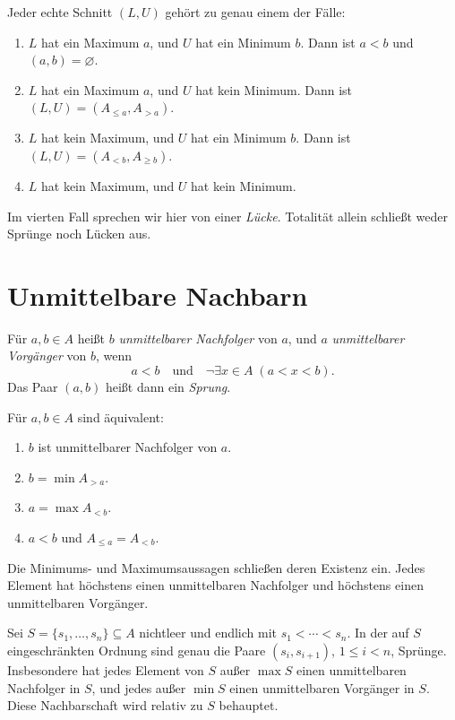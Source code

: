 \begin{theorem}
\label{b15guide:thm:cut-types}
Jeder echte Schnitt $(L,U)$ gehört zu genau einem der Fälle:
\begin{enumerate}
 \item $L$ hat ein Maximum $a$, und $U$ hat ein Minimum $b$.
       Dann ist $a<b$ und $(a,b)=\varnothing$.
 \item $L$ hat ein Maximum $a$, und $U$ hat kein Minimum.
       Dann ist $(L,U)=(A_{\leq a},A_{>a})$.
 \item $L$ hat kein Maximum, und $U$ hat ein Minimum $b$.
       Dann ist $(L,U)=(A_{<b},A_{\geq b})$.
 \item $L$ hat kein Maximum, und $U$ hat kein Minimum.
\end{enumerate}
Im vierten Fall sprechen wir hier von einer \emph{Lücke}.
Totalität allein schließt weder Sprünge noch Lücken aus.
\end{theorem}

\section{Unmittelbare Nachbarn}

\begin{definition}
\label{b15guide:def:neighbor}
Für $a,b\in A$ heißt $b$ \emph{unmittelbarer Nachfolger} von $a$,
und $a$ \emph{unmittelbarer Vorgänger} von $b$, wenn
\[
 a<b\quad\text{und}\quad
 \neg\exists x\in A\;(a<x<b).
\]
Das Paar $(a,b)$ heißt dann ein \emph{Sprung}.
\end{definition}

\begin{theorem}
\label{b15guide:thm:neighbor}
Für $a,b\in A$ sind äquivalent:
\begin{enumerate}
 \item $b$ ist unmittelbarer Nachfolger von $a$.
 \item $b=\min A_{>a}$.
 \item $a=\max A_{<b}$.
 \item $a<b$ und $A_{\leq a}=A_{<b}$.
\end{enumerate}
Die Minimums- und Maximumsaussagen schließen deren Existenz ein.
Jedes Element hat höchstens einen unmittelbaren Nachfolger
und höchstens einen unmittelbaren Vorgänger.
\end{theorem}

\begin{theorem}
\label{b15guide:thm:finite-neighbors}
Sei $S=\{s_1,\ldots,s_n\}\subseteq A$ nichtleer und endlich
mit $s_1<\cdots<s_n$. In der auf $S$ eingeschränkten Ordnung
sind genau die Paare $(s_i,s_{i+1})$, $1\leq i<n$, Sprünge.
Insbesondere hat jedes Element von $S$ außer $\max S$ einen
unmittelbaren Nachfolger in $S$, und jedes außer $\min S$
einen unmittelbaren Vorgänger in $S$.
Diese Nachbarschaft wird relativ zu $S$ behauptet.
\end{theorem}
